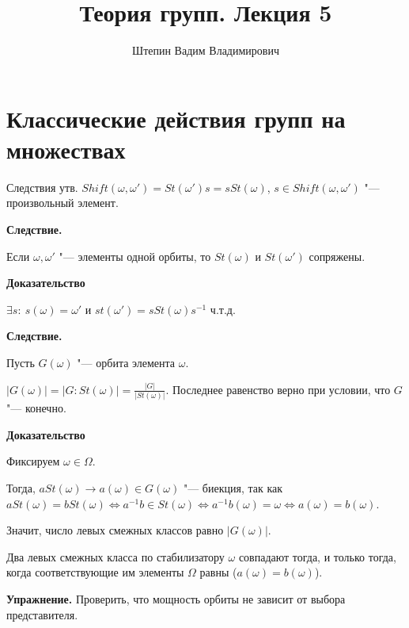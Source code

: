 \documentclass{article}
\title{Теория групп. Лекция 5}
\author{Штепин Вадим Владимирович}
\date{\DTMdate{2019-10-03}}
\begin{document}
\maketitle

\section{Классические действия групп на множествах}

Следствия утв. $Shift(\omega, \omega') = St(\omega')s = sSt(\omega)$, $s \in Shift(\omega, \omega')$ "--- произвольный элемент.

\vspace{10pt}

\textbf{Следствие.}

Если $\omega, \omega'$ "--- элементы одной орбиты, то $St(\omega)$ и $St(\omega')$ сопряжены.

\vspace{5pt}


\textbf{Доказательство}

$\exists s: \  s(\omega) = \omega'$ и $st(\omega') = sSt(\omega)s^{-1}$ ч.т.д.

\vspace{10pt}

\textbf{Следствие.}

Пусть $G(\omega)$ "--- орбита элемента $\omega$.

$|G(\omega)| = |G:St(\omega)| = \frac{|G|}{|St(\omega)|}$. Последнее равенство верно при условии, что $G$ "--- конечно.

\vspace{5pt}

\textbf{Доказательство}

Фиксируем $\omega \in \Omega$.

Тогда, $aSt(\omega) \rightarrow a(\omega) \in G(\omega)$ "--- биекция, так как $aSt(\omega) = bSt(\omega) \Leftrightarrow a^{-1}b \in St(\omega) \Leftrightarrow a^{-1}b(\omega) = \omega \Leftrightarrow a(\omega) = b(\omega)$.

Значит, число левых смежных классов равно $|G(\omega)|$. 

\vspace{5pt}

Два левых смежных класса по стабилизатору $\omega$ совпадают тогда, и только тогда, когда соответствующие им элементы $\Omega$ равны ($a(\omega) = b(\omega)$).

\vspace{5pt}

\textbf{Упражнение.} Проверить, что мощность орбиты не зависит от выбора представителя.
\end{document}
